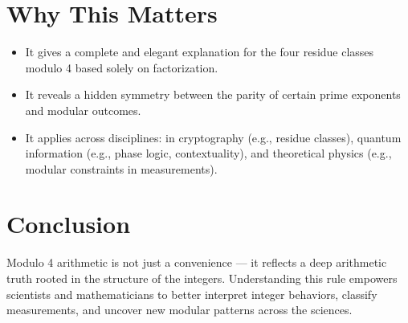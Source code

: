 \documentclass[12pt]{article}
\begin{document}
\section*{Why This Matters}
\begin{itemize}
    \item It gives a complete and elegant explanation for the four residue classes modulo 4 based solely on factorization.
    \item It reveals a hidden symmetry between the parity of certain prime exponents and modular outcomes.
    \item It applies across disciplines: in cryptography (e.g., residue classes), quantum information (e.g., phase logic, contextuality), and theoretical physics (e.g., modular constraints in measurements).
\end{itemize}

\section*{Conclusion}
Modulo 4 arithmetic is not just a convenience — it reflects a deep arithmetic truth rooted in the structure of the integers. Understanding this rule empowers scientists and mathematicians to better interpret integer behaviors, classify measurements, and uncover new modular patterns across the sciences.
\end{document}
